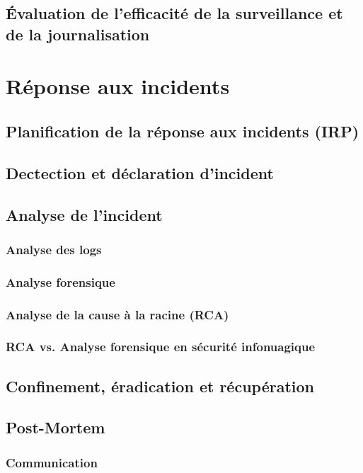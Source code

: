 \documentclass[conference]{IEEEtran}
\begin{document}
\subsection{Évaluation de l'efficacité de la surveillance et de la journalisation}

\section{Réponse aux incidents}

\subsection{Planification de la réponse aux incidents (IRP)}

\subsection{Dectection et déclaration d'incident}
\subsection{Analyse de l'incident}
\subsubsection{Analyse des logs}
\subsubsection{Analyse forensique}
\subsubsection{Analyse de la cause à la racine (RCA)}
\subsubsection{RCA vs. Analyse forensique en sécurité infonuagique}
\subsection{Confinement, éradication et récupération}

\subsection{Post-Mortem}
\subsubsection{Communication}
\end{document}
